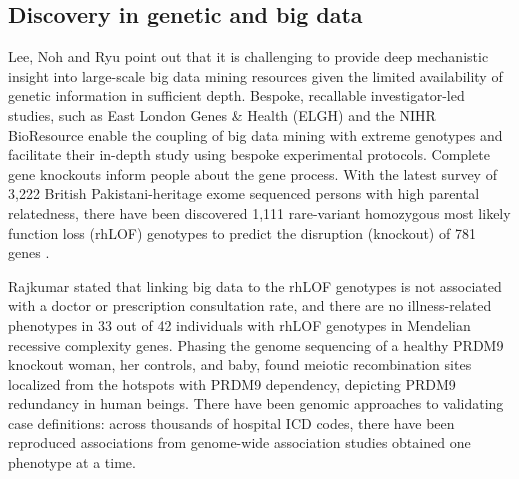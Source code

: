 \documentclass[sigconf]{acmart}
\begin{document}
\subsection{Discovery in genetic and big data}
Lee, Noh and Ryu \cite{lee2011ire1} point out that it is challenging to provide deep mechanistic insight into large-scale big data mining resources given the limited availability of genetic information in sufficient depth.
Bespoke, recallable investigator-led studies, such as East London Genes \& Health (ELGH) and the NIHR BioResource enable the coupling of big data mining with extreme genotypes and facilitate their in-depth study using bespoke experimental protocols.
Complete gene knockouts inform people about the gene process.
With the latest survey of 3,222 British Pakistani-heritage exome sequenced persons with high parental relatedness, there have been discovered 1,111 rare-variant homozygous most likely function loss (rhLOF) genotypes to predict the disruption (knockout) of 781 genes \cite{wang2005framingham}.
\par Rajkumar \cite{rajkumar2010diagnosis} stated that linking big data to the rhLOF genotypes is not associated with a doctor or prescription consultation rate, and there are no illness-related phenotypes in 33 out of 42 individuals with rhLOF genotypes in Mendelian recessive complexity genes.
Phasing the genome sequencing of a healthy PRDM9 knockout woman, her controls, and baby, found meiotic recombination sites localized from the hotspots with PRDM9 dependency, depicting PRDM9 redundancy in human beings.
There have been genomic approaches to validating case definitions: across thousands of hospital ICD codes, there have been reproduced associations from genome-wide association studies obtained one phenotype at a time.
\end{document}
